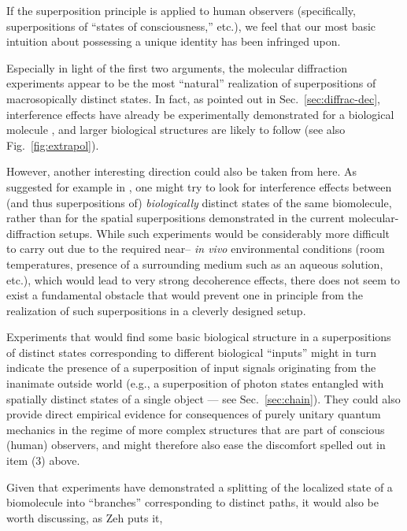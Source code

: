 \documentclass[12pt,aps,floatfix,amsmath,amssymb,showpacs,nofootinbib]{revtex4-2}
\begin{document}
\item If the superposition principle is applied to human observers
  (specifically, superpositions of ``states of consciousness,'' etc.),
  we feel that our most basic intuition about possessing a unique
  identity has been infringed upon.
  
\en
  
Especially in light of  the first two arguments, the molecular
diffraction experiments appear to be the most ``natural'' realization
of superpositions of macrosopically distinct states. In fact, as
pointed out in Sec.~\ref{sec:diffrac-dec}, interference effects have
already be experimentally demonstrated for a biological molecule
\cite{Hackermueller:2002:wb}, and larger biological structures are
likely to follow \cite{Arndt:2002:bo,Hackermuller:2003:uu} (see also
Fig.~\ref{fig:extrapol}).

However, another interesting direction could also be taken from here.
As suggested for example in
\cite{Shimony:1998:yy,Leggett:2002:uy}, one might try to look
for interference effects between (and thus superpositions of) {\em
  biologically} distinct states of the same biomolecule, rather than
for the spatial superpositions demonstrated in the current
molecular-diffraction setups. While such experiments would be
considerably more difficult to carry out due to the required near--{\em
  in vivo} environmental conditions (room temperatures, presence of a
surrounding medium such as an aqueous solution, etc.), which would lead to very
strong decoherence effects, there does not seem to exist a fundamental
obstacle that would prevent one in principle from the realization of
such superpositions in a cleverly designed setup.

Experiments that would find some basic biological structure in a
superpositions of distinct states corresponding to different
biological ``inputs'' might in turn indicate the presence of a
superposition of input signals originating from the inanimate outside
world (e.g., a superposition of photon states entangled with spatially
distinct states of a single object --- see Sec.~\ref{sec:chain}).
They could also provide direct empirical evidence for consequences of
purely unitary quantum mechanics in the regime of more complex
structures that are part of conscious (human) observers, and might
therefore also ease the discomfort spelled out in item (3) above.

Given that experiments \cite{Hackermueller:2002:wb} have demonstrated
a splitting of the localized state of a biomolecule into ``branches''
corresponding to distinct paths, it would also be 
worth discussing, as Zeh \cite{Zeh:2000:rr} puts it,
\end{document}
